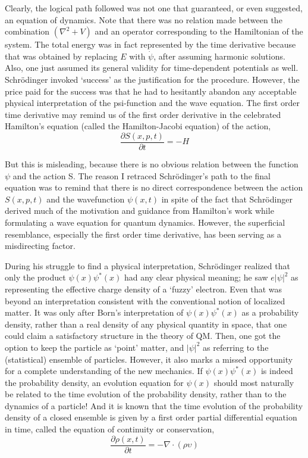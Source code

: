 Clearly, the logical path followed was not one that guaranteed, or even suggested, an
equation of dynamics. Note that there was no relation made between the combination
$(\nabla^2 + V )$ and an operator corresponding to the Hamiltonian of the system. The total energy
was in fact represented by the time derivative because that was obtained by replacing $E$
with $\dot{\psi}$, after assuming harmonic solutions. Also, one just assumed its general validity for
time-dependent potentials as well. Schr\"{o}dinger invoked `success' as the justification for the
procedure. However, the price paid for the success was that he had to hesitantly abandon
any acceptable physical interpretation of the psi-function and the wave equation. The first
order time derivative may remind us of the first order derivative in the celebrated Hamilton's
equation (called the Hamilton-Jacobi equation) of the action,
\begin{equation*}
\frac{\partial S (x,p,t)}{\partial t} = - H \tag{7}
\end{equation*}

But this is misleading, because there is no obvious relation between the function $\psi$ and the
action S. The reason I retraced Schr\"{o}dinger's path to the final equation was to remind
that there is no direct correspondence between the action $S(x, p, t)$ and the wavefunction
$\psi(x, t)$ in spite of the fact that Schr\"{o}dinger derived much of the motivation and guidance
from Hamilton's work while formulating a wave equation for quantum dynamics. However,
the superficial resemblance, especially the first order time derivative, has been serving as a
misdirecting factor.

During his struggle to find a physical interpretation, Schr\"{o}dinger realized that only the
product $\psi(x) \psi^{\ast}(x)$ had any clear physical meaning; he saw $e|\psi|^2$ as representing the effective
charge density of a `fuzzy' electron. Even that was beyond an interpretation consistent
with the conventional notion of localized matter. It was only after Born's interpretation of
$\psi(x)\psi^{\ast} (x)$ as a probability density, rather than a real density of any physical quantity in
space, that one could claim a satisfactory structure in the theory of QM. Then, one got the
option to keep the particle as `point' matter, and $|\psi|^2$ as referring to the (statistical) ensemble
of particles. However, it also marks a missed opportunity for a complete understanding of
the new mechanics. If $\psi(x) \psi^{\ast} (x)$ is indeed the probability density, an evolution equation
for $\psi(x)$ should most naturally be related to the time evolution of the probability density,
rather than to the dynamics of a particle! And it is known that the time evolution of the
probability density of a closed ensemble is given by a first order partial differential equation
in time, called the equation of continuity or conservation,
\begin{equation*}
\frac{\partial \rho (x,t)}{\partial t} = - \nabla \cdot (\rho \upsilon) \tag{8}
\end{equation*}

